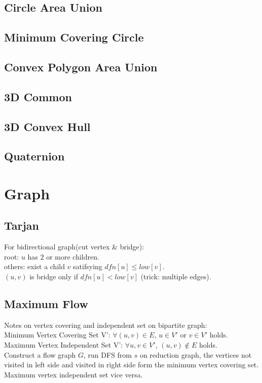 \documentclass[10pt]{article}
\begin{document}
{\subsection{Circle Area Union}

\subsection{Minimum Covering Circle}

\subsection{Convex Polygon Area Union}

\subsection{3D Common}

\subsection{3D Convex Hull}

\subsection{Quaternion}

\section{Graph}
\subsection{Tarjan}

For bidirectional graph(cut vertex \& bridge): \\
root: $u$ has $2$ or more children. \\
others: exist a child $v$ satifsying $dfn[u] \le low[v]$. \\
$(u, v)$ is bridge only if $dfn[u] < low[v]$ (trick: multiple edges).\\
\subsection{Maximum Flow}

Notes on vertex covering and independent set on bipartite graph:\\
Minimum Vertex Covering Set V': $\forall (u,v) \in E$, $u \in V'$ or $v \in V'$ holds. \\
Maximum Vertex Independent Set V': $\forall u,v \in V'$, $(u,v) \notin E$ holds.\\
Construct a flow graph $G$, run DFS from $s$ on reduction graph, the vertices not visited in left side and visited in right side form the minimum vertex covering set.\\
Maximum vertex independent set vice versa.\\
}
\end{document}
